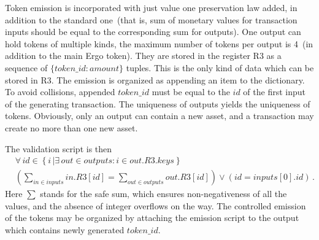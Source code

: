 Token emission is incorporated with just value one preservation law added, in addition to the standard one~(that is,
sum of monetary values for transaction inputs should be equal to the corresponding sum for outputs). One output can
hold tokens of multiple kinds, the maximum number of tokens per output is 4~(in addition to the main Ergo token).
They are stored in the register R3 as a sequence of $\{token\_id: amount\}$ tuples. This is the only kind of data
which can be stored in R3.  The emission is organized as appending an item to
the dictionary. To avoid collisions, appended $token\_id$ must be equal to the
$id$ of the first input of the generating transaction. The uniqueness of outputs
yields the uniqueness of tokens. Obviously, only an output can contain a new asset, and a transaction
may create no more than one new asset.

 The validation script is then
\begin{eqnarray*}
    &\forall\,id\in \left\{ i\, | \exists\, out \in outputs : i\in out.R3.keys
    \right\} \nonumber\\
    &\left(\sum_{in\in inputs} in.R3[id] = \sum_{out\in
    outputs} out.R3[id] \right) \vee \left(id = inputs[0].id\right)\,.
\end{eqnarray*}
Here $\sum$ stands for the safe sum, which ensures non-negativeness of all the
values, and the absence of integer overflows on the way. The controlled emission of the
tokens may be organized by attaching the emission script to the output which contains newly generated $token\_id$.


